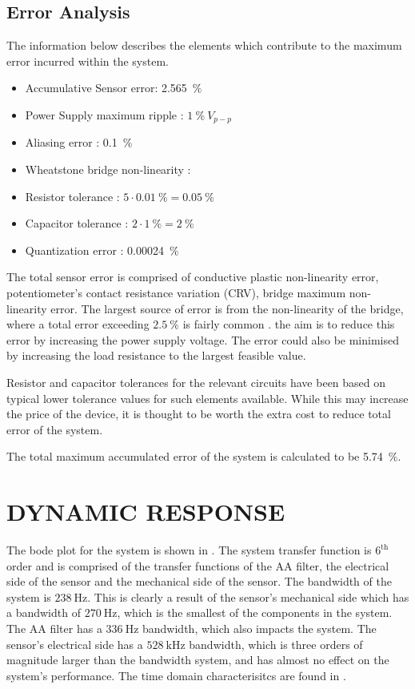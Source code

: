 \documentclass[10pt,twocolumn]{witseiepaper}
\begin{document}
\subsection{Error Analysis}

The information below describes the elements which contribute to the maximum error incurred within the system.

\begin{itemize}
	\item Accumulative Sensor error: 2.565~$\%$
	\item Power Supply maximum ripple : $1~\%~V_{p-p}$
	\item Aliasing error : 0.1~$\%$
	\item Wheatstone bridge non-linearity : 
	\item Resistor tolerance : $5\cdot0.01~\% = 0.05~\%$
	\item Capacitor tolerance : $2\cdot1~\% = 2~\%$
	\item Quantization error : 0.00024~$\%$
\end{itemize}

The total sensor error is comprised of conductive plastic non-linearity error, potentiometer's contact resistance variation (CRV), bridge maximum non-linearity error. The largest source of error is from the non-linearity of the bridge, where a total error exceeding $2.5~\%$ is fairly common \cite{nonlinearity}. the aim is to reduce this error by increasing the power supply voltage. The error could also be minimised by increasing the load resistance to the largest feasible value.

Resistor and capacitor tolerances for the relevant circuits have been based on typical lower tolerance values for such elements available. While this may increase the price of the device, it is thought to be worth the extra cost to reduce total error of the system.

The total maximum accumulated error of the system is calculated to be 5.74~$\%$. 

\section{DYNAMIC RESPONSE}

The bode plot for the system is shown in . The system transfer function is $\mathrm{6^{th}}$ order and is comprised of the transfer functions of the AA filter, the electrical side of the sensor and the mechanical side of the sensor. The bandwidth of the system is $238~\mathrm{Hz}$. This is clearly a result of the sensor's mechanical side which has a bandwidth of $270~\mathrm{Hz}$, which is the smallest of the components in the system. The AA filter has a $336~\mathrm{Hz}$ bandwidth, which also impacts the system. The sensor's electrical side has a $528~\mathrm{kHz}$ bandwidth, which is three orders of magnitude larger than the  bandwidth system, and has almost no effect on the system's performance. The time domain characterisitcs are found in .
\end{document}
